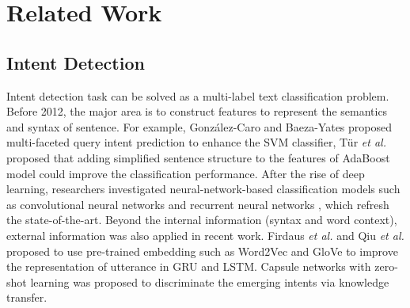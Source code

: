 \documentclass[11pt]{article}
\begin{document}
\section{Related Work}
\label{sec:related_work}
\subsection{Intent Detection}
Intent detection task can be solved as a multi-label text classification problem. Before 2012, the major area is to construct features to represent the semantics and syntax of sentence. For example, González-Caro and Baeza-Yates \cite{DBLP:conf/spire/Gonzalez-CaroB11} proposed multi-faceted query intent prediction to enhance the SVM classifier, Tür \emph{et al.}\cite{DBLP:conf/icassp/TurHHP11} proposed that adding simplified sentence structure to the features of AdaBoost model could improve the classification performance. After the rise of deep learning, researchers investigated neural-network-based classification models such as convolutional neural networks \cite{DBLP:conf/asru/XuS13} and recurrent neural networks \cite{DBLP:conf/interspeech/RavuriS15}, which refresh the state-of-the-art. Beyond the internal information (syntax and word context), external information was also applied in recent work. Firdaus \emph{et al.} \cite{DBLP:conf/pricai/FirdausBEB18} and Qiu \emph{et al.} \cite{DBLP:journals/access/QiuCJZ18} proposed to use pre-trained embedding such as Word2Vec\cite{DBLP:journals/corr/abs-1301-3781} and GloVe\cite{DBLP:conf/emnlp/PenningtonSM14} to improve the representation of utterance in GRU\cite{DBLP:journals/corr/ChungGCB14} and LSTM\cite{DBLP:conf/interspeech/SakSB14}. Capsule networks \cite{DBLP:conf/emnlp/XiaZYCY18} with zero-shot learning was proposed to discriminate the emerging intents via knowledge transfer.
\end{document}
